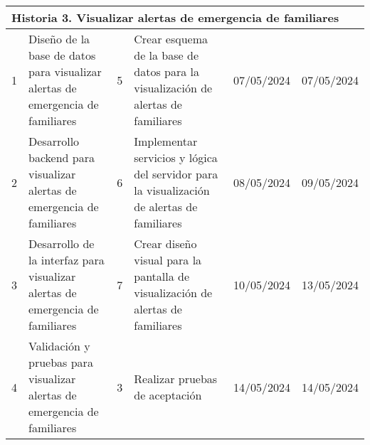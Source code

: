 \begin{longtable}{|p{0.5cm}|p{2cm}|p{1cm}|p{3cm}|p{1cm}|p{1cm}|}
    \multicolumn{6}{|l|}{\textbf{Historia 3. Visualizar alertas de emergencia de familiares}}                                                                                                                                                                                                                                                                                                                                          \\ \hline
    1                                        & Diseño de la base de datos para visualizar alertas de emergencia de familiares    & 5                                                              & Crear esquema de la base de datos para la visualización de alertas de familiares             & 07/05/2024                                                    & 07/05/2024                                                          \\ \hline
    2                                        & Desarrollo backend para visualizar alertas de emergencia de familiares            & 6                                                              & Implementar servicios y lógica del servidor para la visualización de alertas de familiares   & 08/05/2024                                                    & 09/05/2024                                                          \\ \hline
    3                                        & Desarrollo de la interfaz para visualizar alertas de emergencia de familiares     & 7                                                              & Crear diseño visual para la pantalla de visualización de alertas de familiares               & 10/05/2024                                                    & 13/05/2024                                                          \\ \hline
    4                                        & Validación y pruebas para visualizar alertas de emergencia de familiares          & 3                                                              & Realizar pruebas de aceptación                                                               & 14/05/2024                                                    & 14/05/2024                                                          \\ \hline


\end{longtable}
